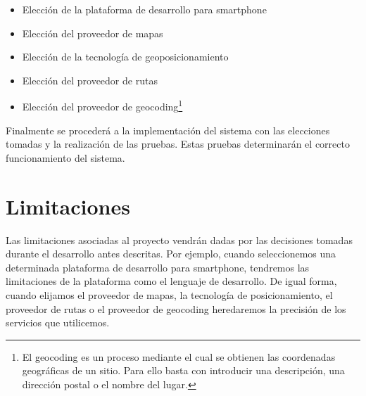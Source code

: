 \begin{itemize}
  \item Elección de la plataforma de desarrollo para smartphone
  \item Elección del proveedor de mapas
  \item Elección de la tecnología de geoposicionamiento
  \item Elección del proveedor de rutas
  \item Elección del proveedor de geocoding\footnote{El geocoding es un proceso mediante el cual se
    obtienen las coordenadas geográficas de un sitio. Para ello basta con introducir una
    descripción, una dirección postal o el nombre del lugar.}
\end{itemize}

Finalmente se procederá a la implementación del sistema con las elecciones tomadas y la
realización de las pruebas. Estas pruebas determinarán el correcto funcionamiento del sistema.

\section{Limitaciones}

Las limitaciones asociadas al proyecto vendrán dadas por las decisiones tomadas durante el
desarrollo antes descritas. Por ejemplo, cuando seleccionemos una determinada plataforma de
desarrollo para smartphone, tendremos las limitaciones de la plataforma como el lenguaje de
desarrollo. De igual forma, cuando elijamos el proveedor de mapas, la tecnología de posicionamiento,
el proveedor de rutas o el proveedor de geocoding heredaremos la precisión de los servicios que
utilicemos.

